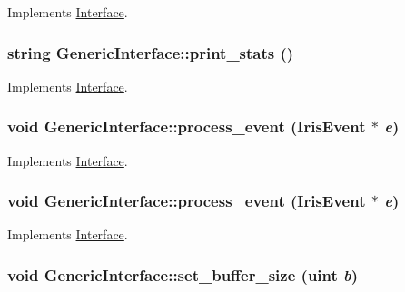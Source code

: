 Implements \hyperlink{classInterface_abfe4b675df488fd5a88d2876cff0ebe}{Interface}.\hypertarget{classGenericInterface_b1be26f08d69932b1ac08094985eb5d6}{
\subsubsection[{print\_\-stats}]{\setlength{\rightskip}{0pt plus 5cm}string GenericInterface::print\_\-stats ()}}
\label{classGenericInterface_b1be26f08d69932b1ac08094985eb5d6}




Implements \hyperlink{classInterface_abfe4b675df488fd5a88d2876cff0ebe}{Interface}.\hypertarget{classGenericInterface_d56b8876204889d3c096fccd61b16b9e}{
\subsubsection[{process\_\-event}]{\setlength{\rightskip}{0pt plus 5cm}void GenericInterface::process\_\-event ({\bf IrisEvent} $\ast$ {\em e})}}
\label{classGenericInterface_d56b8876204889d3c096fccd61b16b9e}




Implements \hyperlink{classInterface_baaaeb823b1e0fd7ddc1bb32c2f016fb}{Interface}.\hypertarget{classGenericInterface_d56b8876204889d3c096fccd61b16b9e}{
\subsubsection[{process\_\-event}]{\setlength{\rightskip}{0pt plus 5cm}void GenericInterface::process\_\-event ({\bf IrisEvent} $\ast$ {\em e})}}
\label{classGenericInterface_d56b8876204889d3c096fccd61b16b9e}




Implements \hyperlink{classInterface_baaaeb823b1e0fd7ddc1bb32c2f016fb}{Interface}.\hypertarget{classGenericInterface_fd1cd1ccd6d355852bee1677cd8b56df}{
\subsubsection[{set\_\-buffer\_\-size}]{\setlength{\rightskip}{0pt plus 5cm}void GenericInterface::set\_\-buffer\_\-size ({\bf uint} {\em b})}}
\label{classGenericInterface_fd1cd1ccd6d355852bee1677cd8b56df}




